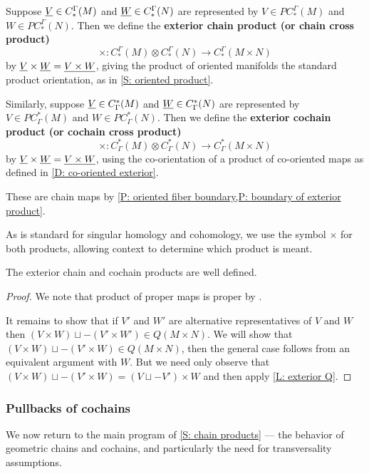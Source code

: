 \begin{definition}\label{D: exterior chain}
	Suppose $\underline{V} \in C_*^{\Gamma}(M)$ and $\underline{W} \in C_*^{\Gamma}(N)$ are represented by $V \in PC_*^{\Gamma}(M)$ and $W \in PC_*^{\Gamma}(N)$.
	Then we define the \textbf{exterior chain product (or chain cross product)} $$\times \colon C_*^{\Gamma}(M) \otimes C_*^{\Gamma}(N) \to C_*^{\Gamma}(M \times N)$$ by $\underline{V} \times \underline{W} = \underline{V \times W}$, giving the product of oriented manifolds the standard product orientation, as in \cref{S: oriented product}.

	Similarly, suppose $\underline{V} \in C^*_{\Gamma}(M)$ and $\underline{W} \in C^*_{\Gamma}(N)$ are represented by $V \in PC^*_{\Gamma}(M)$ and $W \in PC^*_{\Gamma}(N)$.
	Then we define the \textbf{exterior cochain product (or cochain cross product)}
	$$\times \colon C^*_{\Gamma}(M) \otimes C^*_{\Gamma}(N) \to C^*_{\Gamma}(M \times N)$$ by $\underline{V} \times \underline{W} = \underline{V \times W}$, using the co-orientation of a product of co-oriented maps as defined in \cref{D: co-oriented exterior}.

	These are chain maps by \cref{P: oriented fiber boundary,P: boundary of exterior product}.
\end{definition}

As is standard for singular homology and cohomology, we use the symbol $\times$ for both products, allowing context to determine which product is meant.

\begin{proposition}
	The exterior chain and cochain products are well defined.
\end{proposition}

\begin{proof}
	We note that product of proper maps is proper by \cite[Proposition I.10.1.4]{Bou98}.

	It remains to show that if $V'$ and $W'$ are alternative representatives of $V$ and $W$ then $(V \times W) \sqcup -(V' \times W') \in Q(M \times N)$.
	We will show that $(V \times W) \sqcup -(V' \times W) \in Q(M \times N)$, then the general case follows from an equivalent argument with $W$.
	But we need only observe that $(V \times W) \sqcup -(V' \times W) = (V \sqcup -V') \times W$ and then apply
	\cref{L: exterior Q}.
\end{proof}


\subsubsection{Pullbacks of cochains}\label{S: product pullbacks}
We now return to the main program of \cref{S: chain products} --- the behavior of geometric chains and cochains, and particularly the need for transversality assumptions.

